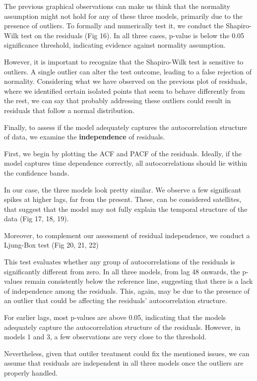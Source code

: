 \documentclass[
]{article}
\begin{document}
The previous graphical observations can make us think that the normality
assumption might not hold for any of these three models, primarily due
to the presence of outliers. To formally and numerically test it, we
conduct the Shapiro-Wilk test on the residuals (Fig 16). In all three
cases, p-value is below the 0.05 significance threshold, indicating
evidence against normality assumption.

However, it is important to recognize that the Shapiro-Wilk test is
sensitive to outliers. A single outlier can alter the test outcome,
leading to a false rejection of normality. Considering what we have
observed on the previous plot of residuals, where we identified certain
isolated points that seem to behave differently from the rest, we can
say that probably addressing these outliers could result in residuals
that follow a normal distribution.

Finally, to assess if the model adequately captures the autocorrelation
structure of data, we examine the \textbf{independence} of residuals.

First, we begin by plotting the ACF and PACF of the residuals. Ideally,
if the model captures time dependence correctly, all autocorrelations
should lie within the confidence bands.

In our case, the three models look pretty similar. We observe a few
significant spikes at higher lags, far from the present. These, can be
considered satellites, that suggest that the model may not fully explain
the temporal structure of the data (Fig 17, 18, 19).

Moreover, to complement our assessment of residual independence, we
conduct a Ljung-Box test (Fig 20, 21, 22)

This test evaluates whether any group of autocorrelations of the
residuals is significantly different from zero. In all three models,
from lag 48 onwards, the p-values remain consistently below the
reference line, suggesting that there is a lack of independence among
the residuals. This, again, may be due to the presence of an outlier
that could be affecting the residuals' autocorrelation structure.

For earlier lags, most p-values are above 0.05, indicating that the
models adequately capture the autocorrelation structure of the
residuals. However, in models 1 and 3, a few observations are very close
to the threshold.

Nevertheless, given that outiler treatment could fix the mentioned
issues, we can assume that residuals are independent in all three models
once the outliers are properly handled.
\end{document}
